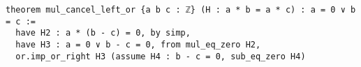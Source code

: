 \documentclass{article}
\begin{document}
\begin{verbatim}
theorem mul_cancel_left_or {a b c : ℤ} (H : a * b = a * c) : a = 0 ∨ b = c :=
  have H2 : a * (b - c) = 0, by simp, 
  have H3 : a = 0 ∨ b - c = 0, from mul_eq_zero H2,
  or.imp_or_right H3 (assume H4 : b - c = 0, sub_eq_zero H4)
  \end{verbatim}
\end{document}
